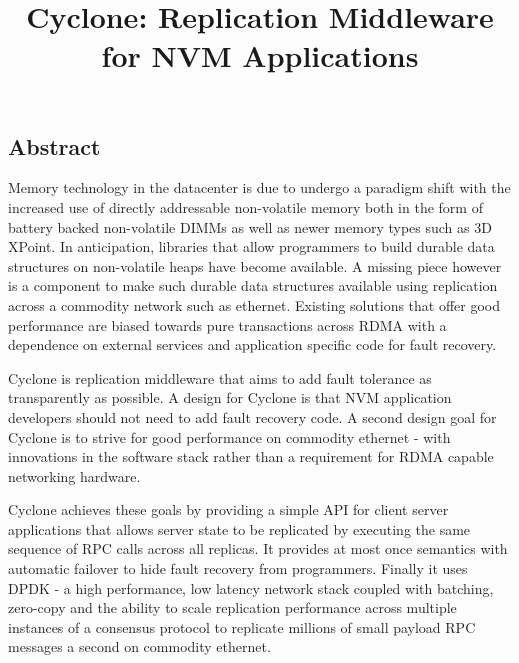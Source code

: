 \documentclass[letterpaper,twocolumn,10pt]{article}
\begin{document}
\date{}

\title{\Large \bf Cyclone: Replication Middleware for NVM Applications}


\maketitle

\thispagestyle{empty}

\subsection*{Abstract}
Memory technology in the datacenter is due to undergo a paradigm shift with the
increased use of directly addressable non-volatile memory both in the form of
battery backed non-volatile DIMMs as well as newer memory types such as
3D XPoint. In anticipation, libraries that allow programmers to build durable
data structures on non-volatile heaps have become available. A missing piece
however is a component to make such durable data structures available using
replication across a commodity network such as ethernet. Existing solutions that
offer good performance are biased towards pure transactions across RDMA with a
dependence on external services and application specific code for fault recovery.

Cyclone is replication middleware that aims to add fault tolerance as
transparently as possible. A design for Cyclone is that NVM application
developers should not need to add fault recovery code. A second design goal for
Cyclone is to strive for good performance on commodity ethernet - with
innovations in the software stack rather than a requirement for RDMA capable
networking hardware.

Cyclone achieves these goals by providing a simple API for client server
applications that allows server state to be replicated by executing the same
sequence of RPC calls across all replicas. It provides at most once semantics
with automatic failover to hide fault recovery from programmers. Finally it uses
DPDK - a high performance, low latency network stack coupled with batching,
zero-copy and the ability to scale replication performance across
multiple instances of a consensus protocol to replicate millions of small
payload RPC messages a second on commodity ethernet.
\end{document}
